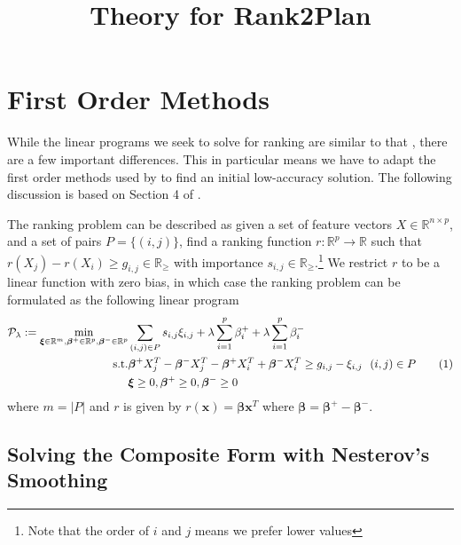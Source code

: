 \documentclass[a4paper, 11pt]{article}
\title{Theory for Rank2Plan}
\newcommand{\R}{\ensuremath{\mathbb{R}}}
\newcommand{\Pc}{\ensuremath{\mathcal{P}}}
\newcommand{\slack}{\ensuremath{\xi}}
\newcommand{\slacks}{\ensuremath{\bm{\xi}}}
\newcommand{\weight}{\ensuremath{\beta}}
\newcommand{\weights}{\ensuremath{\bm{\beta}}}
\newcommand\numberthis{\addtocounter{equation}{1}\tag{\theequation}}
\begin{document}
\maketitle

\section{First Order Methods}

While the linear programs we seek to solve for ranking are similar to that
\citet{Dedieu2022}, there are a few important differences. This in particular
means we have to adapt the first order methods used by \citet{Dedieu2022} to
find an initial low-accuracy solution. The following discussion is based on
Section 4 of \citet{Dedieu2022}.

The ranking problem can be described as given a set of feature vectors $X \in
    \R^{n \times p}$, and a set of pairs $P = \{(i, j)\}$,
find a ranking function $r: \R^p \rightarrow \R$ such that $r(X_j) - r(X_i)
    \ge g_{i,j} \in \R_{\ge}$ with importance $s_{i,j} \in \R_{\ge}$.\footnote{Note that the order of $i$
    and $j$ means we prefer lower values} We restrict $r$ to be a linear
function with zero bias, in which case the ranking problem can be formulated
as the following linear program
\begin{align*}
    \Pc_\lambda := \min_{\slacks \in \R^m,\weights^+ \in \R^p, \weights^- \in \R^p} & \sum_{(i,j) \in P} s_{i, j} \slack_{i,j} + \lambda \sum_{i = 1}^p \weight^+_i + \lambda \sum_{i=1}^p \weight^-_i                                 \\
    \text{s.t.}                                                                     & \weights^+ X_j^T - \weights^- X_j^T - \weights^+ X_i^T + \weights^- X_i^T \ge g_{i,j} - \slack_{i,j} \ \ (i, j) \in P \numberthis \label{eqn:lp} \\
                                                                                    & \slacks \ge 0, \weights^+ \ge 0, \weights^- \ge 0
\end{align*}
where $m = |P|$ and $r$ is given by $r(\bm{x}) = \weights \bm{x}^T$ where $\weights =
    \weights^+ - \weights^-$.

\subsection{Solving the Composite Form with Nesterov's Smoothing}
\end{document}
